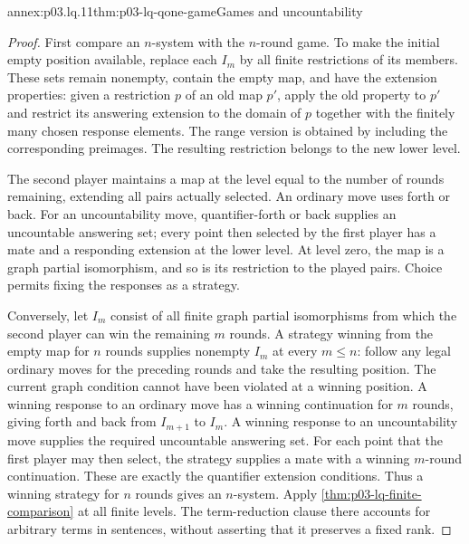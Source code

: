 \begin{annexitem}{annex:p03.lq.11}{thm:p03-lq-qone-game}{Games and uncountability}
\begin{proof}
First compare an \(n\)-system with the \(n\)-round game. To make
the initial empty position available, replace each \(I_m\) by all
finite restrictions of its members. These sets remain nonempty,
contain the empty map, and have the extension properties: given a
restriction \(p\) of an old map \(p'\), apply the old property to
\(p'\) and restrict its answering extension to the domain of
\(p\) together with the finitely many chosen response elements.
The range version is obtained by including the corresponding
preimages. The resulting restriction belongs to the new lower level.

The second player maintains a map at the level equal to the number
of rounds remaining, extending all pairs actually selected. An
ordinary move uses forth or back. For an uncountability move,
quantifier-forth or back supplies an uncountable answering set;
every point then selected by the first player has a mate and a
responding extension at the lower level. At level zero, the map is
a graph partial isomorphism, and so is its restriction to the played
pairs. Choice permits fixing the responses as a strategy.

Conversely, let \(I_m\) consist of all finite graph partial
isomorphisms from which the second player can win the remaining
\(m\) rounds. A strategy winning from the empty map for \(n\)
rounds supplies nonempty \(I_m\) at every \(m\leq n\): follow
any legal ordinary moves for the preceding rounds and take the
resulting position. The current graph condition cannot have been
violated at a winning position. A winning response to an ordinary
move has a winning continuation for \(m\) rounds, giving forth
and back from \(I_{m+1}\) to \(I_m\). A winning response to an
uncountability move supplies the required uncountable answering
set. For each point that the first player may then select, the
strategy supplies a mate with a winning \(m\)-round continuation.
These are exactly the quantifier extension conditions. Thus a
winning strategy for \(n\) rounds gives an \(n\)-system.
Apply \cref{thm:p03-lq-finite-comparison} at all finite levels.
The term-reduction clause there accounts for arbitrary terms in
sentences, without asserting that it preserves a fixed rank.
\end{proof}
\end{annexitem}

